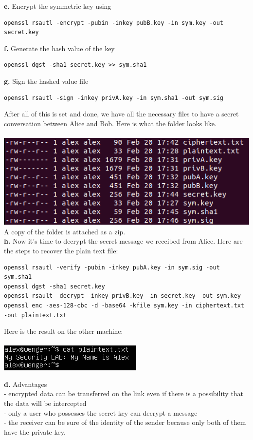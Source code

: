 \documentclass[12pt]{extarticle}
\begin{document}
\textbf{e.} Encrypt the symmetric key using
\begin{verbatim}
openssl rsautl -encrypt -pubin -inkey pubB.key -in sym.key -out secret.key
\end{verbatim}

\textbf{f.} Generate the hash value of the key
\begin{verbatim}
openssl dgst -sha1 secret.key >> sym.sha1
\end{verbatim}

\textbf{g.} Sign the hashed value file
\begin{verbatim}
openssl rsautl -sign -inkey privA.key -in sym.sha1 -out sym.sig
\end{verbatim}

After all of this is set and done, we have all the necessary files to have a secret conversation between Alice and Bob. Here is what the folder looks like.\\\\
\includegraphics[scale=0.6]{resources/3.png}
A copy of the folder is attached as a zip.\\

\textbf{h.} Now it's time to decrypt the secret message we receibed from Alice. Here are the steps to recover the plain text file:
\begin{verbatim}
openssl rsautl -verify -pubin -inkey pubA.key -in sym.sig -out sym.sha1
openssl dgst -sha1 secret.key
openssl rsault -decrypt -inkey privB.key -in secret.key -out sym.key
openssl enc -aes-128-cbc -d -base64 -kfile sym.key -in ciphertext.txt -out plaintext.txt
\end{verbatim}
Here is the result on the other machine:\\\\
\includegraphics[scale=0.9]{resources/4.png}

\textbf{d.} Advantages\\
- encrypted data can be transferred on the link even if there is a possibility that the data will be intercepted\\
- only a user who possesses the secret key can decrypt a message\\
- the receiver can be sure of the identity of the sender because only both of them have the private key.
\end{document}
